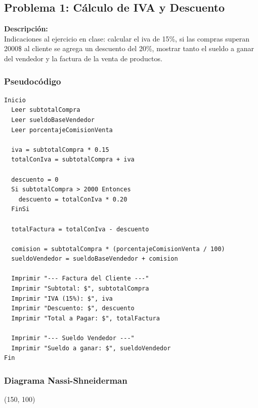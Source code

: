 \documentclass[12pt, a4paper]{article}
\begin{document}
\newpage
\subsection{Problema 1: Cálculo de IVA y Descuento}
\textbf{Descripción:}\\
Indicaciones al ejercicio en clase: calcular el iva de 15\%, si las compras superan 2000\$ al cliente se agrega un descuento del 20\%, mostrar tanto el sueldo a ganar del vendedor y la factura de la venta de productos.

\subsubsection{Pseudocódigo}
\begin{verbatim}
Inicio
  Leer subtotalCompra
  Leer sueldoBaseVendedor
  Leer porcentajeComisionVenta
  
  iva = subtotalCompra * 0.15
  totalConIva = subtotalCompra + iva
  
  descuento = 0
  Si subtotalCompra > 2000 Entonces
    descuento = totalConIva * 0.20
  FinSi
  
  totalFactura = totalConIva - descuento
  
  comision = subtotalCompra * (porcentajeComisionVenta / 100)
  sueldoVendedor = sueldoBaseVendedor + comision
  
  Imprimir "--- Factura del Cliente ---"
  Imprimir "Subtotal: $", subtotalCompra
  Imprimir "IVA (15%): $", iva
  Imprimir "Descuento: $", descuento
  Imprimir "Total a Pagar: $", totalFactura
  
  Imprimir "--- Sueldo Vendedor ---"
  Imprimir "Sueldo a ganar: $", sueldoVendedor
Fin
\end{verbatim}

\subsubsection{Diagrama Nassi-Shneiderman}
\vspace{0.5cm}
\begin{center}
\begin{struktogramm}(150, 100)
  \change
  \ifend
\end{struktogramm}
\end{center}
\vspace{1.5cm}
\end{document}
